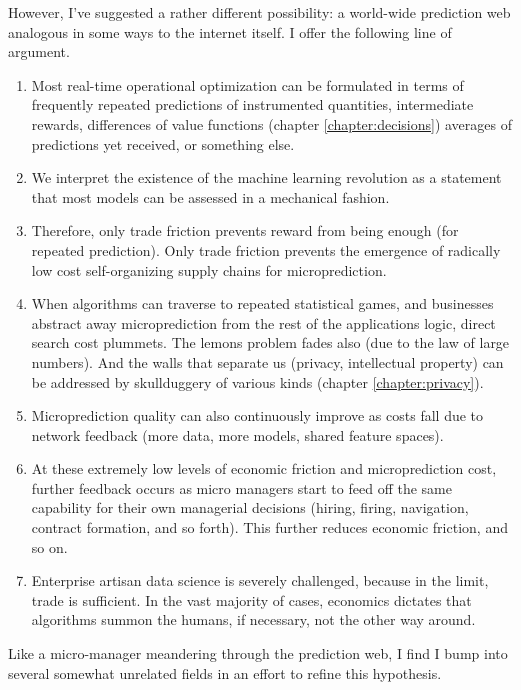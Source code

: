 However, I've suggested a rather different possibility: a world-wide prediction web analogous in some ways to the internet itself. I offer the following line of argument.     

\begin{enumerate}
  \item Most real-time operational optimization can be formulated in terms of frequently repeated predictions of instrumented quantities, intermediate rewards, differences of value functions (chapter \ref{chapter:decisions}) averages of predictions yet received, or something else. 
   \item We interpret the existence of the machine learning revolution as a statement that most models can be assessed in a mechanical fashion.
  \item Therefore, only trade friction prevents reward from being enough (for repeated prediction). Only trade friction prevents the emergence of radically low cost self-organizing supply chains for microprediction. 
  \item When algorithms can traverse to repeated statistical games, and businesses abstract away microprediction from the rest of the applications logic, direct search cost plummets. The lemons problem fades also (due to the law of large numbers). And the walls that separate us (privacy, intellectual property) can be addressed by skullduggery of various kinds (chapter \ref{chapter:privacy}). 
    \item Microprediction quality can also continuously improve as costs fall due to network feedback (more data, more models, shared feature spaces). 
  \item At these extremely low levels of economic friction and microprediction cost, further feedback occurs as micro managers start to feed off the same capability for their own managerial decisions (hiring, firing, navigation, contract formation, and so forth). This further reduces economic friction, and so on. 
  \item Enterprise artisan data science is severely challenged, because in the limit, trade is sufficient. In the vast majority of cases, economics dictates that algorithms summon the humans, if necessary, not the other way around.  
\end{enumerate}

Like a micro-manager meandering through the prediction web, I find I bump into several somewhat unrelated fields in an effort to refine this hypothesis. 


